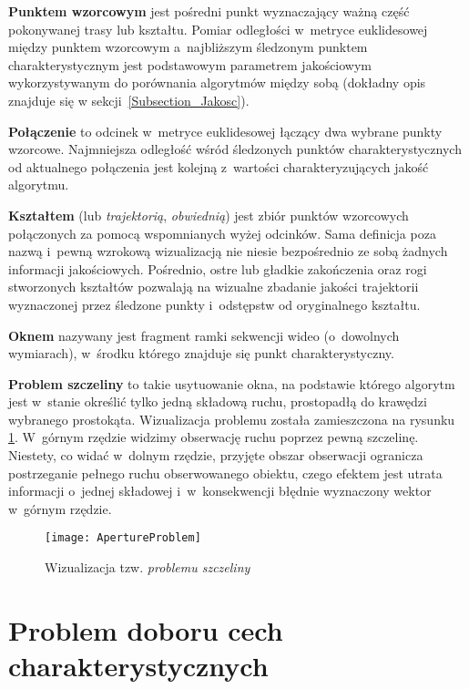     \textbf{Punktem wzorcowym} jest pośredni punkt wyznaczający ważną część pokonywanej trasy lub kształtu. Pomiar odległości w~metryce euklidesowej między punktem wzorcowym a~najbliższym śledzonym punktem charakterystycznym jest podstawowym parametrem jakościowym wykorzystywanym do porównania algorytmów między sobą (dokładny opis znajduje się w sekcji~\ref{Subsection_Jakosc}).

    \textbf{Połączenie} to odcinek w~metryce euklidesowej łączący dwa wybrane punkty wzorcowe. Najmniejsza odległość wśród śledzonych punktów charakterystycznych od aktualnego połączenia jest kolejną z~wartości charakteryzujących jakość algorytmu.

    \textbf{Kształtem} (lub \textit{trajektorią}, \textit{obwiednią}) jest zbiór punktów wzorcowych połączonych za pomocą wspomnianych wyżej odcinków. Sama definicja poza nazwą i~pewną wzrokową wizualizacją nie niesie bezpośrednio ze sobą żadnych informacji jakościowych. Pośrednio, ostre lub gładkie zakończenia oraz rogi stworzonych kształtów pozwalają na wizualne zbadanie jakości trajektorii wyznaczonej przez śledzone punkty i~odstępstw od oryginalnego kształtu.

    \textbf{Oknem} nazywany jest fragment ramki sekwencji wideo (o~dowolnych wymiarach), w~środku którego znajduje się punkt charakterystyczny.

    \textbf{Problem szczeliny} to takie usytuowanie okna, na podstawie którego algorytm jest w~stanie określić tylko jedną składową ruchu, prostopadłą do krawędzi wybranego prostokąta. Wizualizacja problemu została zamieszczona na rysunku \ref{fig:ApertureProblem}. W~górnym rzędzie widzimy obserwację ruchu poprzez pewną szczelinę. Niestety, co widać w~dolnym rzędzie, przyjęte obszar obserwacji ogranicza postrzeganie pełnego ruchu obserwowanego obiektu, czego efektem jest utrata informacji o~jednej składowej i~w~konsekwencji błędnie wyznaczony wektor w~górnym rzędzie.

      \begin{figure}[!ht]
        \centering
        \texttt{[image: ApertureProblem]}
        \caption[Wizualizacja tzw. problemu szczeliny]{Wizualizacja tzw. \textit{problemu szczeliny}}
        \label{fig:ApertureProblem}
      \end{figure}

  \newpage
  \section{Problem doboru cech charakterystycznych}\label{Section_GoodFeaturesToTrack}

